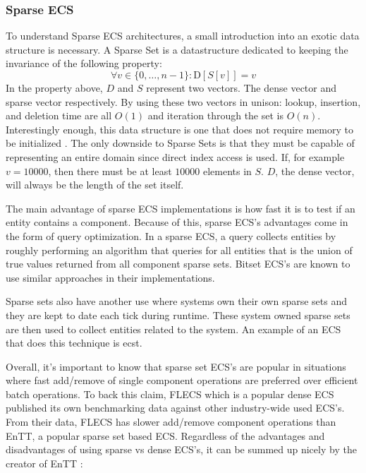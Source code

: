 \subsubsection{Sparse ECS}
To understand Sparse ECS architectures, a small introduction into an exotic data structure is necessary. A Sparse Set is a datastructure dedicated to keeping the invariance of the following property:
\begin{equation*}
    \forall v \in \{0,\ldots, n-1\} : \text{D}[S[v]] = v
\end{equation*}
In the property above, $D$ and $S$ represent two vectors. The dense vector and sparse vector respectively. By using these two vectors in unison: lookup, insertion, and deletion time are all $O(1)$ and iteration through the set is $O(n)$. Interestingly enough, this data structure is one that does not require memory to be initialized \cite{sparse_profit}. The only downside to Sparse Sets is that they must be capable of representing an entire domain since direct index access is used. If, for example $v = 10000$, then there must be at least $10000$ elements in $S$. $D$, the dense vector, will always be the length of the set itself.

The main advantage of sparse ECS implementations is how fast it is to test if an entity contains a component. Because of this, sparse ECS's advantages come in the form of query optimization. In a sparse ECS, a query collects entities by roughly performing an algorithm that queries for all entities that is the union of true values returned from all component sparse sets. Bitset ECS's are known to use similar approaches in their implementations.\cite{EnTT_SparseSets}

Sparse sets also have another use where systems own their own sparse sets and they are kept to date each tick during runtime. These system owned sparse sets are then used to collect entities related to the system. An example of an ECS that does this technique is ecst. \cite{ecst}

Overall, it's important to know that sparse set ECS's are popular in situations where fast add/remove of single component operations are preferred over efficient batch operations. To back this claim, FLECS which is a popular dense ECS published its own benchmarking data against other industry-wide used ECS's. From their data, FLECS has slower add/remove component operations than EnTT, a popular sparse set based ECS.\cite{FLECS_EnTTCompare} Regardless of the advantages and disadvantages of using sparse vs dense ECS's, it can be summed up nicely by the creator of EnTT \cite{EnTT_archetype_and_quote}:

